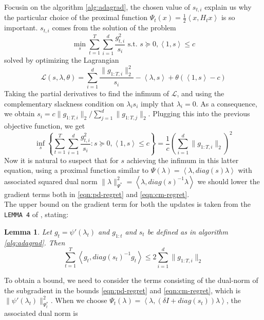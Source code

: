 \documentclass[notitlepage]{article}
\newtheorem{lemma}{Lemma}[section]
\begin{document}
Focusin on the algorithm \ref{alg:adagrad}, the chosen value of $s_{t,i}$ explain us why the particular choice of the proximal function $\Psi_t(x) = \frac{1}{2} \left\langle x,H_t x \right\rangle$ is so important. $s_{t,i}$ comes from the solution of the problem
\[ \min_s \sum_{t=1}^T \sum_{i=1}^d \frac{g_{t,i}^2}{s_i} \text{ s.t. } s \succeq 0, \left\langle 1,s \right\rangle \le c \] 
solved by optimizing the Lagrangian
\[ \mathcal{L}(s,\lambda,\theta) = \sum_{i=1}^d \frac{\| g_{1:T,i} \|_2^2}{s_i} - \left\langle \lambda,s \right\rangle + \theta (\left\langle 1,s \right\rangle - c ) \]
Taking the partial derivatives to find the infimum of $\mathcal{L}$, and using the complementary slackness condition on $\lambda_i s_i$ imply that $\lambda_i = 0$. As a consequence, we obtain $s_i = c \| g_{1:T,i} \|_2 / \sum_{j=1}^d \| g_{1:T,j} \|_2$.
Plugging this into the previous objective function, we get
\[ \inf_s \left\lbrace \sum_{t=1}^T \sum_{i=1}^d \frac{g_{t,i}^2}{s_i} : s \succeq 0, \left\langle 1,s \right\rangle \le c \right\rbrace = \frac{1}{c} \left(\sum_{i=1}^d \| g_{1:T,i} \|_2 \right)^2  \]
Now it is natural to suspect that for $s$ achieving the infimum in this latter equation, using a proximal function similar to $\Psi(\lambda) = \left\langle \lambda,diag(s) \lambda \right\rangle$ with associated squared dual norm $\|\lambda\|_{\Psi^*}^2 = \left\langle \lambda,diag(s)^{-1}\lambda \right\rangle$ we should 
lower the gradient terms both in \eqref{eqn:pd-regret} and \eqref{eqn:cm-regret}.\\
The upper bound on the gradient term for both the updates is taken from the \texttt{LEMMA 4} of \cite{JMLR:v12:duchi11a}, stating:
\begin{lemma}
  Let $g_t = \psi'(\lambda_t)$ and $g_{1:t}$ and $s_t$ be defined as in algorithm \ref{alg:adagrad}. Then 
  \[ \sum_{t=1}^T \left\langle g_t,diag(s_t)^{-1}g_t \right\rangle \le 2 \sum_{i=1}^d \|g_{1:T,i}\|_2 \]
\end{lemma}
To obtain a bound, we need to consider the terms consisting of the dual-norm of the subgradient in the bounds \eqref{eqn:pd-regret} and \eqref{eqn:cm-regret}, which is $\|\psi'(\lambda_t)\|_{\Psi_t^*}^2$. When we choose $\Psi_t(\lambda) = \left\langle \lambda,(\delta I + diag(s_t)) \lambda \right\rangle$, the associated dual norm is
\end{document}
